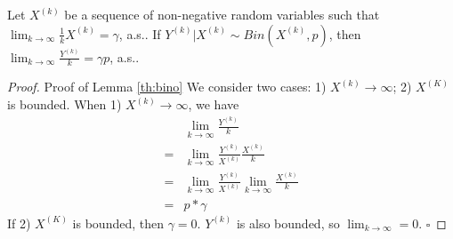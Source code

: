 \section{}\label{ap:bino}
\begin{lemma}\label{th:bino}
Let $X^{(k)}$ be a sequence of non-negative random variables such that $\lim_{k\rightarrow \infty}\frac{1}{k}X^{(k)}=\gamma$, a.s.. If $Y^{(k)}|X^{(k)}\sim Bin(X^{(k)},p)$, then $\lim_{k\rightarrow \infty}\frac{Y^{(k)}}{k} = \gamma p$, a.s..
\end{lemma}
\begin{proof}{Proof of Lemma \ref{th:bino}}
We consider two cases: 1) $X^{(k)}\rightarrow\infty$; 2) $X^{(K)}$ is bounded. When 1) $X^{(k)}\rightarrow\infty$, we have
\begin{align*}
&\lim_{k\rightarrow\infty}\frac{Y^{(k)}}{k}\\
=&\lim_{k\rightarrow\infty}\frac{Y^{(k)}}{X^{(k)}}\frac{X^{(k)}}{k}\\
=&\lim_{k\rightarrow\infty}\frac{Y^{(k)}}{X^{(k)}}\lim_{k\rightarrow\infty}\frac{X^{(k)}}{k}\\
	=&p*\gamma
\end{align*}
If 2) $X^{(K)}$ is bounded, then $\gamma = 0$. $Y^{(k)}$ is also bounded, so $\lim_{k\rightarrow \infty}=0$.
$\square$
\end{proof}
